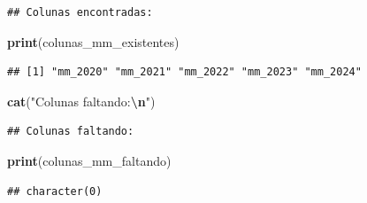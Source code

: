 \documentclass[
]{article}
\newenvironment{Shaded}{\begin{snugshade}}{\end{snugshade}}
\newcommand{\FunctionTok}[1]{\textcolor[rgb]{0.13,0.29,0.53}{\textbf{#1}}}
\newcommand{\NormalTok}[1]{#1}
\newcommand{\SpecialCharTok}[1]{\textcolor[rgb]{0.81,0.36,0.00}{\textbf{#1}}}
\newcommand{\StringTok}[1]{\textcolor[rgb]{0.31,0.60,0.02}{#1}}
\begin{document}
\begin{verbatim}
## Colunas encontradas:
\end{verbatim}

\begin{Shaded}
\begin{Highlighting}[]
\FunctionTok{print}\NormalTok{(colunas\_mm\_existentes)}
\end{Highlighting}
\end{Shaded}

\begin{verbatim}
## [1] "mm_2020" "mm_2021" "mm_2022" "mm_2023" "mm_2024"
\end{verbatim}

\begin{Shaded}
\begin{Highlighting}[]
\FunctionTok{cat}\NormalTok{(}\StringTok{"Colunas faltando:}\SpecialCharTok{\textbackslash{}n}\StringTok{"}\NormalTok{)}
\end{Highlighting}
\end{Shaded}

\begin{verbatim}
## Colunas faltando:
\end{verbatim}

\begin{Shaded}
\begin{Highlighting}[]
\FunctionTok{print}\NormalTok{(colunas\_mm\_faltando)}
\end{Highlighting}
\end{Shaded}

\begin{verbatim}
## character(0)
\end{verbatim}
\end{document}
